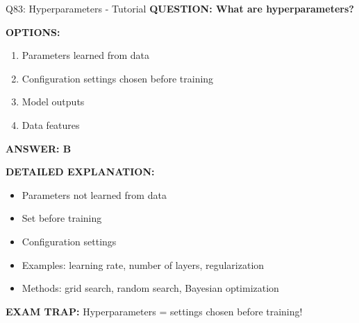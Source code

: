 \documentclass[8pt]{beamer}
\begin{document}
	\begin{frame}{Q83: Hyperparameters - Tutorial}
		\fontsize{6.5}{7.5}\selectfont
		\textbf{QUESTION: What are hyperparameters?}
		
		\vspace{0.1cm}
		\textbf{OPTIONS:}
		\begin{enumerate}
			\item Parameters learned from data
			\item Configuration settings chosen before training
			\item Model outputs
			\item Data features
		\end{enumerate}
		
		\vspace{0.1cm}
		\textcolor{myblue}{\textbf{ANSWER: B}}
		
		\vspace{0.1cm}
		\textbf{DETAILED EXPLANATION:}
		\begin{itemize}
			\item Parameters not learned from data
			\item Set before training
			\item Configuration settings
			\item Examples: learning rate, number of layers, regularization
			\item Methods: grid search, random search, Bayesian optimization
		\end{itemize}
		
		\vspace{0.1cm}
		\textcolor{myred}{\textbf{EXAM TRAP:}} Hyperparameters = \textcolor{myblue}{settings chosen before training}!
	\end{frame}
	
\end{document}
